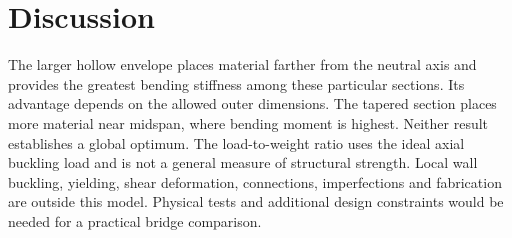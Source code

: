 \documentclass[11pt]{article}
\begin{document}
\section{Discussion}
The larger hollow envelope places material farther from the neutral axis and provides the greatest bending stiffness among these particular sections. Its advantage depends on the allowed outer dimensions. The tapered section places more material near midspan, where bending moment is highest. Neither result establishes a global optimum. The load-to-weight ratio uses the ideal axial buckling load and is not a general measure of structural strength. Local wall buckling, yielding, shear deformation, connections, imperfections and fabrication are outside this model. Physical tests and additional design constraints would be needed for a practical bridge comparison.
\end{document}
